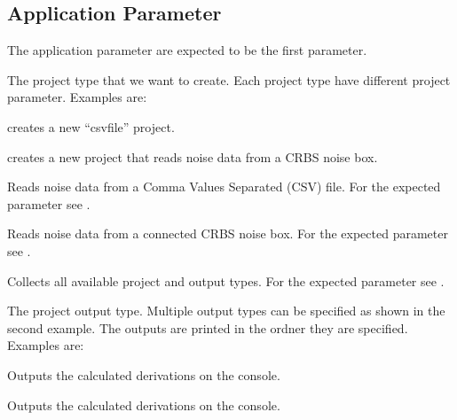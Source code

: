 \subsection{Application Parameter}

The application parameter are expected to be the first parameter.

\label{par:app_project_type}

The project type that we want to create. Each project type have different project
parameter. Examples are:
\begin{compactitem}
\item {} creates a new ``csvfile'' project.
\item {} creates a new project that reads
noise data from a CRBS noise box.
\end{compactitem}

\begin{asparadesc}
\item[\code{project:csvfile}]
Reads noise data from a Comma Values Separated (CSV) file.
For the expected parameter see .
\item[\code{project:crbsnoise}]
Reads noise data from a connected CRBS noise box.
For the expected parameter see .
\item[\code{project:list}]
Collects all available project and output types.
For the expected parameter see .
\end{asparadesc}

\label{par:app_project_output}

The project output type. Multiple output types can be specified as shown in
the second example. The outputs are printed in the ordner they are specified.
Examples are:
\begin{compactitem}
\item {}
Outputs the calculated derivations on the console.
\item {}
Outputs the calculated derivations on the console.
\end{compactitem}


